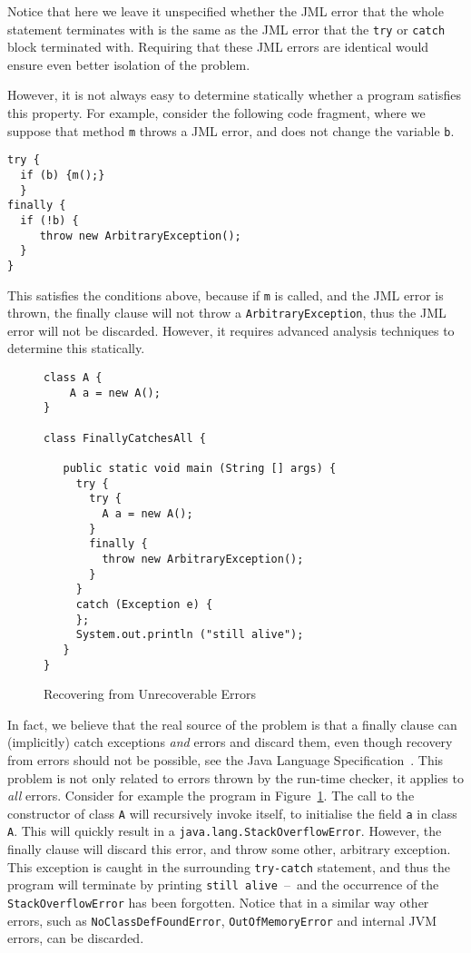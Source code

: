 \documentclass[]{llncs}
\begin{document}
Notice that here we leave it unspecified whether the JML error that
the whole statement terminates with is the same as the JML error that
the \texttt{try} or \texttt{catch} block terminated with. Requiring
that these JML errors are identical would ensure even better isolation
of the problem.

However, it is not always easy to determine statically whether a
program satisfies this property. For example, consider the following
code fragment, where we suppose that method \texttt{m} throws a JML
error, and does not change the variable \texttt{b}.
\begin{verbatim}
try {	
  if (b) {m();}
  }	
finally {
  if (!b) {
     throw new ArbitraryException();
  }
}
\end{verbatim}
This satisfies the conditions above, because if \texttt{m} is called,
and the JML error is thrown, the finally clause will not throw a
\texttt{ArbitraryException}, thus the JML error will not be
discarded. However, it requires advanced analysis techniques to
determine this statically.

\begin{figure}[t]
\begin{verbatim}
class A {
    A a = new A();
}

class FinallyCatchesAll {

   public static void main (String [] args) {
     try {
       try { 
         A a = new A();
       }
       finally {
         throw new ArbitraryException();
       }
     }
     catch (Exception e) {
     };
     System.out.println ("still alive");
   }
}
\end{verbatim}
\caption{Recovering from Unrecoverable Errors}\label{FigStackOverflow}
\end{figure}

In fact, we believe that the real source of the problem is that a
finally clause can (implicitly) catch exceptions \emph{and} errors and
discard them, even though recovery from errors should not be possible,
see the Java Language Specification~\cite[\S 11.5]{GoslingJSB05}. This
problem is not only related to errors thrown by the run-time checker,
it applies to \emph{all} errors. Consider for example the program in
Figure~\ref{FigStackOverflow}. The call to the constructor of class
\texttt{A} will recursively invoke itself, to initialise the
field \texttt{a} in class \texttt{A}. This will quickly result in a
\texttt{java.lang.StackOverflowError}. However, the finally clause
will discard this error, and throw some other, arbitrary
exception. This exception is caught in the surrounding
\texttt{try-catch} statement, and thus the program will terminate by
printing \texttt{still alive}~--~and the occurrence of the
\texttt{StackOverflowError} has been forgotten. Notice that in a
similar way other errors, such as \texttt{NoClassDefFoundError}, 
\texttt{OutOfMemoryError} and internal JVM errors, can be
discarded.
\end{document}
